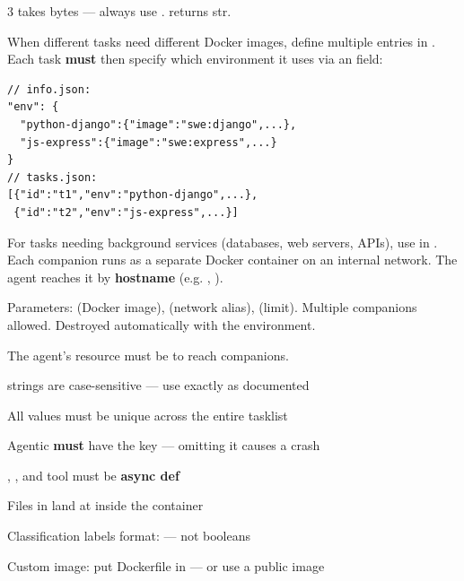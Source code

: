 \documentclass[10pt,landscape]{article}
\begin{document}
\begin{multicols}{3}
  takes bytes --- always use .  returns str.


When different tasks need different Docker images, define multiple entries in . Each task \textbf{must} then specify which environment it uses via an  field:

\begin{lstlisting}
// info.json:
"env": {
  "python-django":{"image":"swe:django",...},
  "js-express":{"image":"swe:express",...}
}
// tasks.json:
[{"id":"t1","env":"python-django",...},
 {"id":"t2","env":"js-express",...}]
\end{lstlisting}



For tasks needing background services (databases, web servers, APIs), use  in . Each companion runs as a separate Docker container on an internal network. The agent reaches it by \textbf{hostname} (e.g. , ).

Parameters:  (Docker image),  (network alias),  (limit). Multiple companions allowed. Destroyed automatically with the environment.

The agent's  resource must be  to reach companions.


\bull {} strings are case-sensitive --- use exactly as documented

\bull All  values must be unique across the entire tasklist

\bull Agentic  \textbf{must} have the  key --- omitting it causes a crash

\bull {}, , and tool  must be \textbf{async def}

\bull Files in  land at  inside the container

\bull Classification labels format:  --- not booleans

\bull Custom image: put Dockerfile in  --- or use a public image


\end{multicols}
\end{document}
